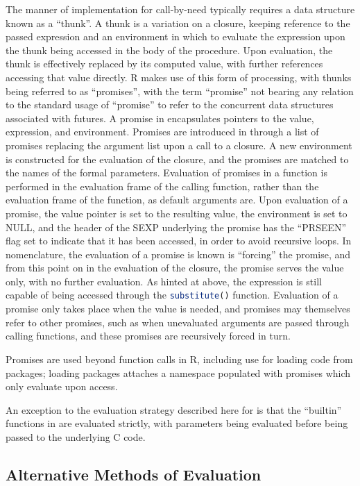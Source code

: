 The manner of implementation for call-by-need typically requires a data structure known as a ``thunk''\cite{ingerman1961thunks}.
A thunk is a variation on a closure, keeping reference to the passed expression and an environment in which to evaluate the expression upon the thunk being accessed in the body of the procedure.
Upon evaluation, the thunk is effectively replaced by its computed value, with further references accessing that value directly.
R makes use of this form of processing, with thunks being referred to as ``promises'', with the term ``promise'' not bearing any relation to the standard usage of ``promise'' to refer to the concurrent data structures associated with futures\cite{rcore2020lang:promise}.
A promise in \R encapsulates pointers to the value, expression, and environment.
Promises are introduced in \R through a list of promises replacing the argument list upon a call to a closure.
A new environment is constructed for the evaluation of the closure, and the promises are matched to the names of the formal parameters.
Evaluation of promises in a function is performed in the evaluation frame of the calling function, rather than the evaluation frame of the function, as default arguments are.
Upon evaluation of a promise, the value pointer is set to the resulting value, the environment is set to NULL, and the header of the SEXP underlying the promise has the ``PRSEEN'' flag set to indicate that it has been accessed, in order to avoid recursive loops.
In \R nomenclature, the evaluation of a promise is known is ``forcing'' the promise, and from this point on in the evaluation of the closure, the promise serves the value only, with no further evaluation.
As hinted at above, the expression is still capable of being accessed through the \lstinline[language=R]{substitute()} function.
Evaluation of a promise only takes place when the value is needed, and promises may themselves refer to other promises, such as when unevaluated arguments are passed through calling functions, and these promises are recursively forced in turn.

Promises are used beyond function calls in R, including use for loading code from packages; loading packages attaches a namespace populated with promises which only evaluate upon access.

An exception to the evaluation strategy described here for \R is that the ``builtin'' functions in \R are evaluated strictly, with parameters being evaluated before being passed to the underlying C code.

\subsection{Alternative Methods of Evaluation}

